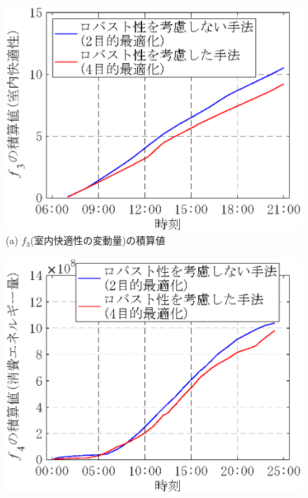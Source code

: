 \begin{figure}[htbp]
    \begin{center}
        \begin{minipage}{.7\textwidth}
            \begin{center}
                \includegraphics[width=1\textwidth,keepaspectratio=true]{fig/robust_result_schedule_accumulated_comfort.eps}\\\vspace{0.1cm}
                {(a) $f_3$(室内快適性の変動量)の積算値}
            \end{center}
        \end{minipage}
        \begin{minipage}{.7\textwidth}
            \begin{center}
                \includegraphics[width=1\textwidth,keepaspectratio=true]{fig/robust_result_schedule_accumulated_power.eps}\\\vspace{0.1cm}

\end{center}
\end{minipage}
\end{center}
\end{figure}
